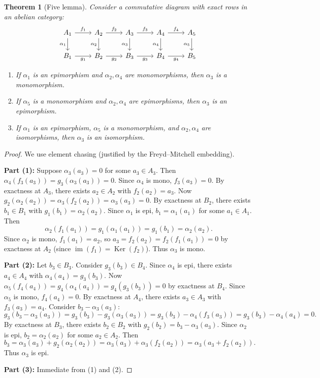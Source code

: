 \documentclass[a4paper,12pt]{book}
\DeclareMathOperator{\im}{im}
\DeclareMathOperator{\Ker}{Ker}
\theoremstyle{definition}
\theoremstyle{plain}
\newtheorem{theorem}[definition]{Theorem}
\theoremstyle{remark}
\begin{document}
\begin{theorem}[Five lemma]\label{thm:five-lemma}
Consider a commutative diagram with exact rows in an abelian category:
\[
\begin{tikzcd}
    A_1 \arrow[r, "f_1"] \arrow[d, "\alpha_1"'] & A_2 \arrow[r, "f_2"] \arrow[d, "\alpha_2"']
    & A_3 \arrow[r, "f_3"] \arrow[d, "\alpha_3"'] & A_4 \arrow[r, "f_4"] \arrow[d, "\alpha_4"']
    & A_5 \arrow[d, "\alpha_5"'] \\
    B_1 \arrow[r, "g_1"'] & B_2 \arrow[r, "g_2"'] & B_3 \arrow[r, "g_3"']
    & B_4 \arrow[r, "g_4"'] & B_5
\end{tikzcd}
\]
\begin{enumerate}
    \item If $\alpha_1$ is an epimorphism and $\alpha_2, \alpha_4$ are monomorphisms,
    then $\alpha_3$ is a monomorphism.
    \item If $\alpha_5$ is a monomorphism and $\alpha_2, \alpha_4$ are epimorphisms,
    then $\alpha_3$ is an epimorphism.
    \item If $\alpha_1$ is an epimorphism, $\alpha_5$ is a monomorphism, and
    $\alpha_2, \alpha_4$ are isomorphisms, then $\alpha_3$ is an isomorphism.
\end{enumerate}
\end{theorem}

\begin{proof}
We use element chasing (justified by the Freyd--Mitchell embedding).

\medskip\noindent
\textbf{Part (1):} Suppose $\alpha_3(a_3) = 0$ for some $a_3 \in A_3$. Then
$\alpha_4(f_3(a_3)) = g_3(\alpha_3(a_3)) = 0$. Since $\alpha_4$ is mono,
$f_3(a_3) = 0$. By exactness at $A_3$, there exists $a_2 \in A_2$ with $f_2(a_2) = a_3$.
Now $g_2(\alpha_2(a_2)) = \alpha_3(f_2(a_2)) = \alpha_3(a_3) = 0$. By exactness at $B_2$,
there exists $b_1 \in B_1$ with $g_1(b_1) = \alpha_2(a_2)$. Since $\alpha_1$ is epi,
$b_1 = \alpha_1(a_1)$ for some $a_1 \in A_1$. Then
\[
    \alpha_2(f_1(a_1)) = g_1(\alpha_1(a_1)) = g_1(b_1) = \alpha_2(a_2).
\]
Since $\alpha_2$ is mono, $f_1(a_1) = a_2$, so
$a_3 = f_2(a_2) = f_2(f_1(a_1)) = 0$ by exactness at $A_2$ (since $\im(f_1) = \Ker(f_2)$).
Thus $\alpha_3$ is mono.

\medskip\noindent
\textbf{Part (2):} Let $b_3 \in B_3$. Consider $g_3(b_3) \in B_4$. Since $\alpha_4$
is epi, there exists $a_4 \in A_4$ with $\alpha_4(a_4) = g_3(b_3)$. Now
$\alpha_5(f_4(a_4)) = g_4(\alpha_4(a_4)) = g_4(g_3(b_3)) = 0$ by exactness at $B_4$.
Since $\alpha_5$ is mono, $f_4(a_4) = 0$.
By exactness at $A_4$, there exists $a_3 \in A_3$ with $f_3(a_3) = a_4$.
Consider $b_3 - \alpha_3(a_3)$:
\[
    g_3(b_3 - \alpha_3(a_3)) = g_3(b_3) - g_3(\alpha_3(a_3))
    = g_3(b_3) - \alpha_4(f_3(a_3)) = g_3(b_3) - \alpha_4(a_4) = 0.
\]
By exactness at $B_3$, there exists $b_2 \in B_2$ with $g_2(b_2) = b_3 - \alpha_3(a_3)$.
Since $\alpha_2$ is epi, $b_2 = \alpha_2(a_2)$ for some $a_2 \in A_2$. Then
\[
    b_3 = \alpha_3(a_3) + g_2(\alpha_2(a_2)) = \alpha_3(a_3) + \alpha_3(f_2(a_2))
    = \alpha_3(a_3 + f_2(a_2)).
\]
Thus $\alpha_3$ is epi.

\medskip\noindent
\textbf{Part (3):} Immediate from (1) and (2).
\end{proof}
\end{document}
